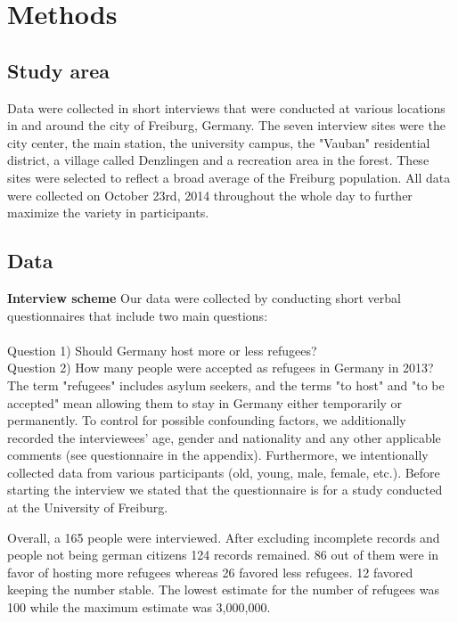 \section{Methods}

\subsection{Study area}
Data were collected in short interviews that were conducted at various locations in and around the city of Freiburg, Germany. The seven interview sites were the city center, the main station, the university campus, the "Vauban" residential district, a village called Denzlingen and a recreation area in the forest. These sites were selected to reflect a broad average of the Freiburg population. All data were collected on October 23rd, 2014 throughout the whole day to further maximize the variety in participants.

\subsection{Data}

\textbf{Interview scheme}
Our data were collected by conducting short verbal questionnaires that include two main questions: \\\\
Question 1) Should Germany host more or less refugees?\\
Question 2) How many people were accepted as refugees in Germany in 2013?\\

The term "refugees" includes asylum seekers, and the terms "to host" and "to be accepted" mean allowing them to stay in Germany either temporarily or permanently. To control for possible confounding factors, we additionally recorded the interviewees’ age, gender and nationality and any other applicable comments (see questionnaire in the appendix). Furthermore, we intentionally collected data from various participants (old, young, male, female, etc.). Before starting the interview we stated that the questionnaire is for a study conducted at the University of Freiburg.

Overall, a 165 people were interviewed. After excluding incomplete records and people not being german citizens 124 records remained. 86 out of them were in favor of hosting more refugees whereas 26 favored less refugees. 12 favored keeping the number stable. The lowest estimate for the number of refugees was 100 while the maximum estimate was 3,000,000.




